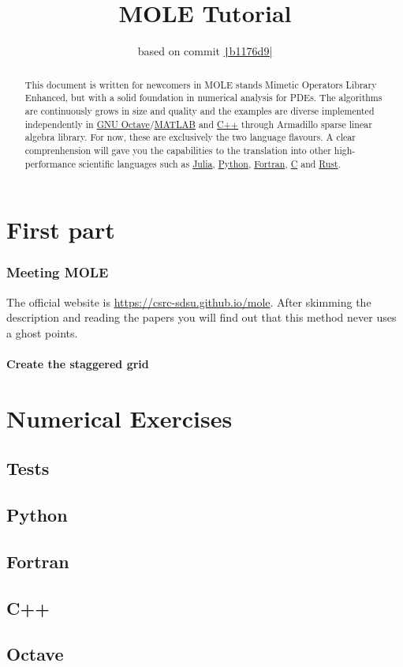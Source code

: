 \documentclass[a4paper,abstract=true]{scrreprt}
\title{\color{DarkBlue}MOLE Tutorial}
\author{based on commit \href{https://github.com/csrc-sdsu/mole/tree/b1176d9969e807fb62bed8fee28bc0eb9648a93a}{\texttt|b1176d9|}}
\begin{document}
\maketitle

\begin{abstract}
    This document is written for newcomers in MOLE stands
    Mimetic Operators Library Enhanced, but with a solid foundation
    in numerical analysis for PDEs.
    The algorithms are continuously grows in size and quality and the
    examples are diverse implemented independently in
    \href{https://octave.org}{GNU Octave}/\href{https://www.mathworks.com/products/matlab.html}{MATLAB}
    and \href{https://isocpp.org}{C++} through Armadillo sparse
    linear algebra library.
    For now, these are exclusively the two language flavours.
    A clear comprenhension will gave you the capabilities to the translation
    into other high-performance scientific languages such as \href{https://julialang.org}{Julia},
    \href{https://www.python.org}{Python}, \href{https://fortran-lang.org}{Fortran}, \href{https://www.open-std.org/jtc1/sc22/wg14}{C}
    and \href{https://www.rust-lang.org}{Rust}.
\end{abstract}

\part{First part}

\section{Meeting MOLE}

The official website is \url{https://csrc-sdsu.github.io/mole}.
After skimming the description and reading the papers you will find out that this method never uses a ghost points.

\subsection{Create the staggered grid}


\part{Numerical Exercises}

\chapter{Tests}

\chapter{Python}

\chapter{Fortran}

\chapter{C++}

\chapter{Octave}
\end{document}
